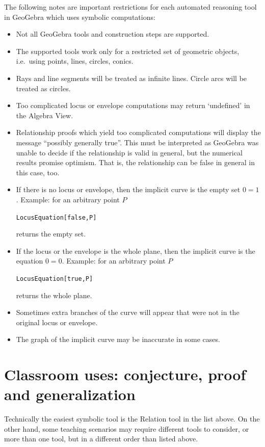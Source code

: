 \documentclass{article}
\begin{document}
The following notes are important restrictions for each automated reasoning tool in GeoGebra which uses symbolic computations:
\begin{itemize}
\item Not all GeoGebra tools and construction steps are supported.
\item The supported tools work only for a restricted set of geometric objects, i.e.~using points, lines, circles, conics.
\item Rays and line segments will be treated as infinite lines. Circle arcs will be treated as circles.
\item Too complicated locus or envelope computations may return `undefined' in the Algebra View.
\item Relationship proofs which yield too complicated computations will display the message ``possibly generally true''. This must be
interpreted as GeoGebra was unable to decide if the relationship is valid in general, but the numerical results promise optimism.
That is, the relationship can be false in general in this case, too.
\item If there is no locus or envelope, then the implicit curve is the empty set $0=1$. Example: for an arbitrary point $P$
\begin{center}
\texttt{LocusEquation[false,P]}
\end{center}
returns the empty set.
\item If the locus or the envelope is the whole plane, then the implicit curve is the equation $0=0$. Example: for an arbitrary point $P$
\begin{center}
\texttt{LocusEquation[true,P]}
\end{center}
returns the whole plane.
\item Sometimes extra branches of the curve will appear that were not in the original locus or envelope.
\item The graph of the implicit curve may be inaccurate in some cases.
\end{itemize}

\section{Classroom uses: conjecture, proof and generalization}

Technically the easiest symbolic tool is the Relation tool in the list above. On the other hand, some teaching scenarios may require different tools to consider, or more than one tool, but in a different order than listed above.
\end{document}

